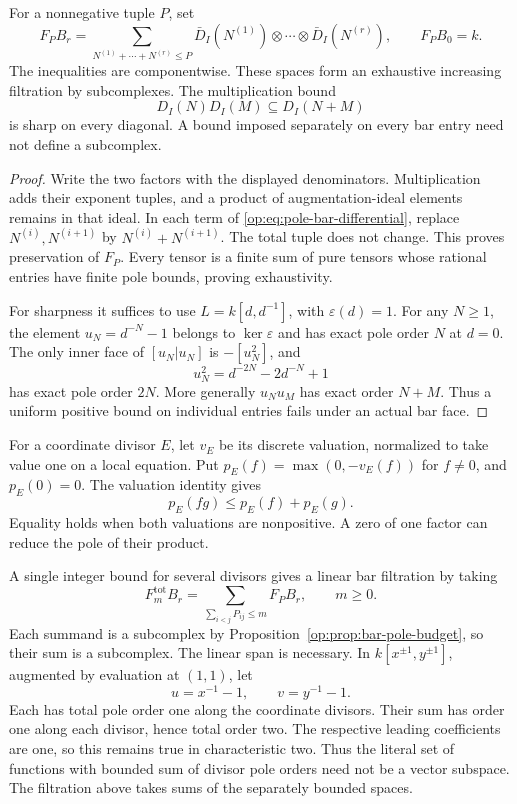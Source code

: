 \begin{proposition}
\label{op:prop:bar-pole-budget}
For a nonnegative tuple \(P\), set
\[
 F_PB_r=
 \sum_{N^{(1)}+\cdots+N^{(r)}\le P}
 \bar D_I(N^{(1)})\otimes\cdots\otimes\bar D_I(N^{(r)}),
 \qquad F_PB_0=k.
\]
The inequalities are componentwise.  These spaces form an exhaustive
increasing filtration by subcomplexes.  The multiplication bound
\[
 D_I(N)D_I(M)\subseteq D_I(N+M)
\]
is sharp on every diagonal.  A bound imposed separately on every bar
entry need not define a subcomplex.
\end{proposition}

\begin{proof}
Write the two factors with the displayed denominators.  Multiplication
adds their exponent tuples, and a product of augmentation-ideal
elements remains in that ideal.  In each term of
\eqref{op:eq:pole-bar-differential}, replace
\(N^{(i)},N^{(i+1)}\) by \(N^{(i)}+N^{(i+1)}\).
The total tuple does not change.  This proves preservation of \(F_P\).
Every tensor is a finite sum of pure tensors whose rational entries
have finite pole bounds, proving exhaustivity.

For sharpness it suffices to use
\(L=k[d,d^{-1}]\), with \(\varepsilon(d)=1\).
For any \(N\ge1\), the element \(u_N=d^{-N}-1\) belongs to
\(\ker\varepsilon\) and has exact pole order \(N\) at \(d=0\).
The only inner face of \([u_N|u_N]\) is
\(-[u_N^2]\), and
\[
 u_N^2=d^{-2N}-2d^{-N}+1
\]
has exact pole order \(2N\).  More generally \(u_Nu_M\) has exact
order \(N+M\).  Thus a uniform positive bound on individual entries
fails under an actual bar face.
\end{proof}

\begin{remark}
\label{op:rem:linear-pole-filtration}
For a coordinate divisor \(E\), let \(v_E\) be its discrete valuation,
normalized to take value one on a local equation.  Put
\(p_E(f)=\max(0,-v_E(f))\) for \(f\ne0\), and \(p_E(0)=0\).
The valuation identity gives
\[
 p_E(fg)\le p_E(f)+p_E(g).
\]
Equality holds when both valuations are nonpositive.  A zero of one
factor can reduce the pole of their product.

A single integer bound for several divisors gives a linear bar
filtration by taking
\[
 F_m^{\mathrm{tot}}B_r=\sum_{\sum_{i<j}P_{ij}\le m}F_PB_r,
 \qquad m\ge0.
\]
Each summand is a subcomplex by
Proposition~\ref{op:prop:bar-pole-budget}, so their sum is a subcomplex.
The linear span is necessary.  In \(k[x^{\pm1},y^{\pm1}]\),
augmented by evaluation at \((1,1)\), let
\[
 u=x^{-1}-1,\qquad v=y^{-1}-1.
\]
Each has total pole order one along the coordinate divisors.
Their sum has order one along each divisor, hence total order two.
The respective leading coefficients are one, so this remains true
in characteristic two.  Thus the literal set of functions with
bounded sum of divisor pole orders need not be a vector subspace.
The filtration above takes sums of the separately bounded spaces.
\end{remark}

